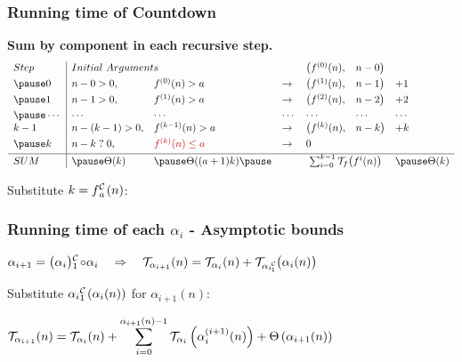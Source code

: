 \begin{frame}
\frametitle{Running time of Countdown}

\pause
\textbf{Sum by component in each recursive step.}
\begin{equation*}
\begin{array}{l|llllll}
Step & \multicolumn{2}{l}{Initial \ Arguments} &  & \big(f^{(0)}(n), & n - 0 \big) &  \\[3pt]
\pause 0    & n - 0 > 0,     & f^{(0)}(n) > a & \to & \big(f^{(1)}(n), & n - 1\big) & + 1 \\[3pt]
\pause 1    & n - 1 > 0, & f^{(1)}(n) > a & \to & \big(f^{(2)}(n), & n - 2\big) & + 2 \\[3pt]
\pause \cdots & \cdots & \cdots & \cdots & \cdots & \cdots & \cdots \\
k-1  & n - (k-1) > 0, & f^{(k-1)}(n) > a & \to & \big(f^{(k)}(n), & n - k\big) & + k \\[3pt]
\pause k & n - k \mathrel{?} 0, & {\color{red} f^{(k)}(n) \le a}  &\to & \multicolumn{2}{l}{0} &  \\[3pt] \hline
SUM & \pause \Theta(k) & \pause \Theta((a+1)k) \pause & &  \multicolumn{2}{c}{\sum_{i=0}^{k-1}\runtime_f\big(f^{i}(n)\big)} & \pause \Theta(k)
\end{array}
\end{equation*}


\pause
Substitute $k = \cdt{f}{a}(n)$:
\end{frame}



\begin{frame}
\frametitle{Running time of each $\alpha_i$ - Asymptotic bounds}

$\displaystyle
\alpha_{i+1} = \cdt{\big(\alpha_i\big)}{1}\circ \alpha_i
\quad \implies \quad \runtime_{\alpha_{i+1}}(n) = \runtime_{\alpha_i}(n) + \runtime_{\cdt{\alpha_i}{1}}\big(\alpha_i(n)\big)
$

\smallskip
{}

\bigskip

Substitute $\cdt{\alpha_i}{1}(\alpha_i(n))$ for $\alpha_{i+1}(n)$:
\bigskip

$ \displaystyle 
\mathcal{T}_{\alpha_{i+1}}(n)
  = \mathcal{T}_{\alpha_i}(n) + 
  \sum_{i=0}^{\alpha_{i+1}(n) - 1} \mathcal{T}_{\alpha_i}\left(\alpha_i^{(i+1)}(n)\right) + \Theta\left(\alpha_{i+1}(n) \right)
$

\smallskip
{}

\end{frame}


